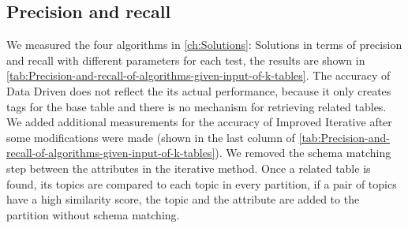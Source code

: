 \subsection{Precision and recall}

We measured the four algorithms in \autoref{ch:Solutions}: Solutions in terms of precision and recall with different parameters for each test, the results are shown in \autoref{tab:Precision-and-recall-of-algorithms-given-input-of-k-tables}. The accuracy of Data Driven does not reflect the its actual performance, because it only creates tags for the base table and there is no mechanism for retrieving related tables. We added additional measurements for the accuracy of Improved Iterative after some modifications were made (shown in the last column of \autoref{tab:Precision-and-recall-of-algorithms-given-input-of-k-tables}). We removed the schema matching step between the attributes in the iterative method. Once a related table is found, its topics are compared to each topic in every partition, if a pair of topics have a high similarity score, the topic and the attribute are added to the partition without schema matching.

